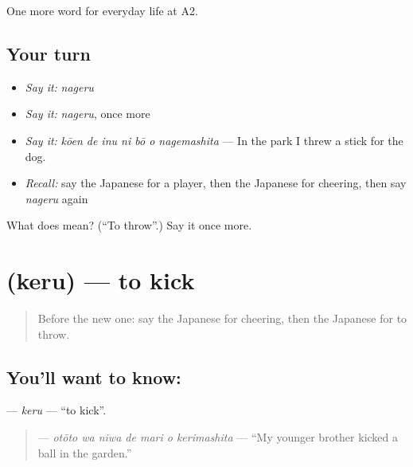 \begin{grammarlens}[title={What you've built}]
One more word for everyday life at A2.
\end{grammarlens}

\subsection*{Your turn}
\begin{itemize}
\raggedright
  \item \emph{Say it:} \emph{nageru}
  \item \emph{Say it:} \emph{nageru}, once more
  \item \emph{Say it:} \emph{kōen de inu ni bō o nagemashita} — In the park I threw a stick for the dog.
  \item \emph{Recall:} say the Japanese for a player, then the Japanese for cheering, then say \emph{nageru} again
\end{itemize}

\begin{tcolorbox}[breakable,colback=teal!4,colframe=teal!35!black,title={Before you move on}]
What does  mean? (\textquotedblleft{}To throw\textquotedblright{}.) Say it once more.
\end{tcolorbox}
\section[\texorpdfstring{\ja{ける} (keru)}{ける (keru)}]{ (keru) — to kick}

\label{lesson:JA-C235-keru}



\begin{quote}
Before the new one: say the Japanese for cheering, then the Japanese for to throw.
\end{quote}

\subsection*{You'll want to know: }
\textbf{} — \emph{keru} — \textquotedblleft{}to kick\textquotedblright{}.

\begin{quote}
\textbf{   } — \emph{otōto wa niwa de mari o kerimashita} — \textquotedblleft{}My younger brother kicked a ball in the garden.\textquotedblright{}
\end{quote}

